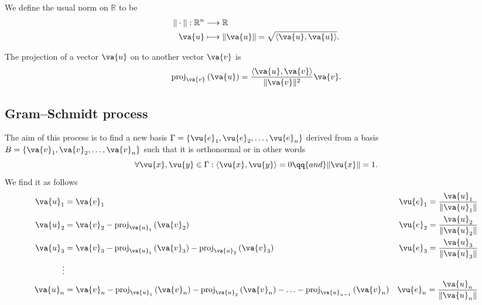\begin{definition}
	We define the usual norm on $\mathbb{R}$ to be
	\begin{align*}
		\|\cdot \|: \mathbb{R}^n & \longrightarrow \mathbb{R}                            \\
		\va{u}                   & \longmapsto \|\va{u}\| = \sqrt{\dotp{\va{u}}{\va{u}}}
		.\end{align*}
\end{definition}
\begin{theorem}
	The projection of a vector $\va{u}$ on to another vector $\va{v}$ is
	\[
		\proj{\va{v}}{\va{u}} = \frac{\dotp{\va{u}}{\va{v}}}{\|\va{v}\|^2}\va{v}
		.\]
\end{theorem}

\subsection{Gram–Schmidt process}
The aim of this process is to find a new basis $\Gamma=\{\vu{e}_1,\vu{e}_2,\ldots,\vu{e}_n\} $ derived from a basis $B=\{\va{v}_1,\va{v}_2,\ldots,\va{v}_n\} $ such that it is orthonormal or in other words
\[
	\forall \vu{x},\vu{y}\in \Gamma: \dotp{\vu{x}}{\vu{y}}=0 \qq{and} \|\vu{x}\|=1
	.\]
We find it as follows
\begin{align*}
	\va{u}_1 & = \va{v}_1 \quad                                                                                    & \vu{e}_1 = \frac{\va{u}_1}{\|\va{u}_1\|} \\
	\va{u}_2 & = \va{v}_2-\proj{\va{u}_1}{\va{v}_2}                                                                & \vu{e}_2 = \frac{\va{u}_2}{\|\va{u}_2\|} \\
	\va{u}_3 & = \va{v}_3-\proj{\va{u}_1}{\va{v}_3}-\proj{\va{u}_2}{\va{v}_3}                                      & \vu{e}_3 = \frac{\va{u}_3}{\|\va{u}_3\|} \\
	\vdots   &                                                                                                     &                                          \\
	\va{u}_n & = \va{v}_n-\proj{\va{u}_1}{\va{v}_n}-\proj{\va{u}_2}{\va{v}_n}-\ldots-\proj{\va{u}_{n-1}}{\va{v}_n} & \vu{e}_n= \frac{\va{u}_n}{\|\va{u}_n\|}  \\
\end{align*}
